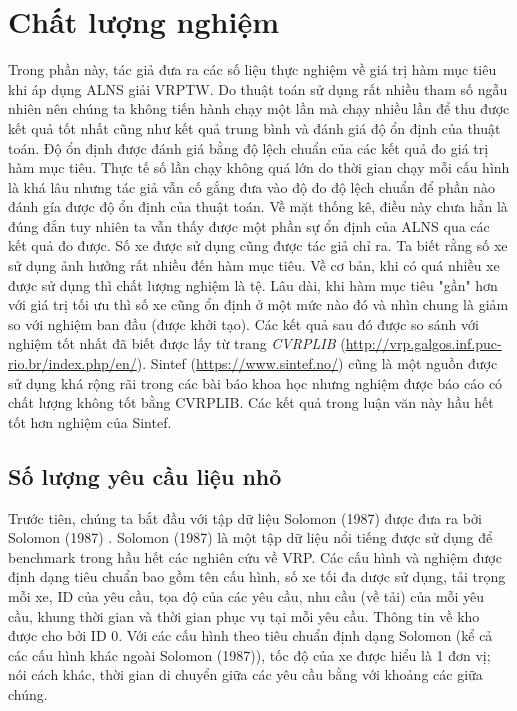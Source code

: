 \section{Chất lượng nghiệm}

Trong phần này, tác giả đưa ra các số liệu thực nghiệm về giá trị hàm mục tiêu khi áp dụng ALNS giải VRPTW. Do thuật toán sử dụng rất nhiều tham số ngẫu nhiên nên chúng ta không tiến hành chạy một lần mà chạy nhiều lần để thu được kết quả tốt nhất cũng như kết quả trung bình và đánh giá độ ổn định của thuật toán. Độ ổn định được đánh giá bằng độ lệch chuẩn của các kết quả đo giá trị hàm mục tiêu. Thực tế số lần chạy không quá lớn do thời gian chạy mỗi cấu hình là khá lâu nhưng tác giả vẫn cố gắng đưa vào độ đo độ lệch chuẩn để phần nào đánh gía được độ ổn định của thuật toán. Về mặt thống kê, điều này chưa hẳn là đúng đắn tuy nhiên ta vẫn thấy được một phần sự ổn định của ALNS qua các kết quả đo được. Số xe được sử dụng cũng được tác giả chỉ ra. Ta biết rằng số xe sử dụng ảnh hưởng rất nhiều đến hàm mục tiêu. Về cơ bản, khi có quá nhiều xe được sử dụng thì chất lượng nghiệm là tệ. Lâu dài, khi hàm mục tiêu "gần" hơn với giá trị tối ưu thì số xe cũng ổn định ở một mức nào đó và nhìn chung là giảm so với nghiệm ban đầu (được khởi tạo). Các kết quả sau đó được so sánh với nghiệm tốt nhất đã biết được lấy từ trang \textit{CVRPLIB} (\href{http://vrp.galgos.inf.puc-rio.br/index.php/en/}{http://vrp.galgos.inf.puc-rio.br/index.php/en/}). Sintef (\href{https://www.sintef.no/}{https://www.sintef.no/}) cũng là một nguồn được sử dụng khá rộng rãi trong các bài báo khoa học nhưng nghiệm được báo cáo có chất lượng không tốt bằng CVRPLIB. Các kết quả trong luận văn này hầu hết tốt hơn nghiệm của Sintef.

\subsection{Số lượng yêu cầu liệu nhỏ}
\label{sec:exp_small}

Trước tiên, chúng ta bắt đầu với tập dữ liệu Solomon (1987) được đưa ra bởi Solomon (1987) \cite{solomon1987algorithms}. Solomon (1987) là một tập dữ liệu nổi tiếng được sử dụng để benchmark trong hầu hết các nghiên cứu về VRP. Các cấu hình và nghiệm được định dạng tiêu chuẩn bao gồm tên cấu hình, số xe tối đa dược sử dụng, tải trọng mỗi xe, ID của yêu cầu, tọa độ của các yêu cầu, nhu cầu (về tải) của mỗi yêu cầu, khung thời gian và thời gian phục vụ tại mỗi yêu cầu. Thông tin về kho được cho bởi ID 0. Với các cấu hình theo tiêu chuẩn định dạng Solomon (kể cả các cấu hình khác ngoài Solomon (1987)), tốc độ của xe được hiểu là 1 đơn vị; nói cách khác, thời gian di chuyển giữa các yêu cầu bằng với khoảng các giữa chúng. 


